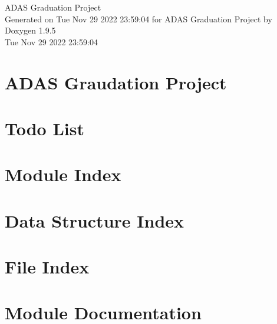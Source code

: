 \documentclass[twoside]{book}
\newcommand{\+}{\discretionary{\mbox{\scriptsize$\hookleftarrow$}}{}{}}
\newcommand{\clearemptydoublepage}{%
    \newpage{\pagestyle{empty}\cleardoublepage}%
  }
\begin{document}
  \raggedbottom
    \hypersetup{pageanchor=false,
                bookmarksnumbered=true,
                pdfencoding=unicode
               }
  \begin{titlepage}
  \vspace*{7cm}
  \begin{center}%
  {\Large ADAS Graduation Project}\\
  \vspace*{1cm}
  {\large Generated on Tue Nov 29 2022 23\+:59\+:04 for ADAS Graduation Project by Doxygen 1.9.5}\\
    \vspace*{0.5cm}
    {\small Tue Nov 29 2022 23:59:04}
  \end{center}
  \end{titlepage}
  \clearemptydoublepage
  \tableofcontents
  \clearemptydoublepage
  \hypersetup{pageanchor=true}
\chapter{ADAS Graudation Project}
\label{index}\hypertarget{index}{}
\chapter{Todo List}
\label{todo}

\chapter{Module Index}

\chapter{Data Structure Index}

\chapter{File Index}

\chapter{Module Documentation}
























\end{document}

